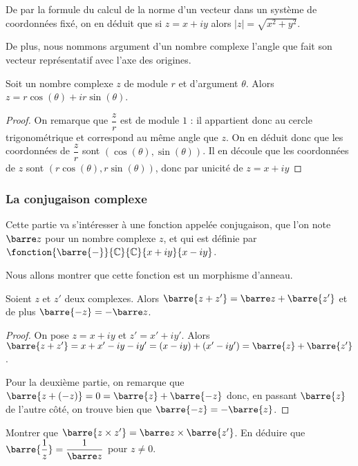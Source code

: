 De par la formule du calcul de la norme d'un vecteur dans un système de coordonnées fixé, on en déduit que si $z=x+iy$ alors $|z|=\sqrt{x^2+y^2}$.

De plus, nous nommons argument d'un nombre complexe l'angle que fait son vecteur représentatif avec l'axe des origines.

\begin{prop}
    Soit un nombre complexe $z$ de module $r$ et d'argument $\theta$. Alors $z=r\cos(\theta)+ir\sin(\theta)$.
\end{prop}
\begin{proof}
    On remarque que $\dfrac{z}{r}$ est de module $1$ : il appartient donc au cercle trigonométrique et correspond au même angle que $z$. On en déduit donc que les coordonnées de $\dfrac{z}{r}$ sont $(\cos(\theta),\sin(\theta))$. Il en découle que les coordonnées de $z$ sont $(r\cos(\theta),r\sin(\theta))$, donc par unicité de $z=x+iy$ 
\end{proof}

\subsubsection{La conjugaison complexe}

Cette partie va s'intéresser à une fonction appelée conjugaison, que l'on note $\barre z$ pour un nombre complexe $z$, et qui est définie par $\fonction{\barre{-}}{\mathbb C}{\mathbb C}{x+iy}{x-iy}$.

Nous allons montrer que cette fonction est un morphisme d'anneau.

\begin{prop}
    Soient $z$ et $z'$ deux complexes. Alors $\barre{z+z'}=\barre z + \barre{z'}$ et de plus $\barre{-z}=-\barre z$.
\end{prop}
\begin{proof}
    On pose $z=x+iy$ et $z'=x'+iy'$. Alors $\barre{z+z'}=x+x'-iy-iy'=(x-iy)+(x'-iy')=\barre{z}+\barre{z'}$.
    
    Pour la deuxième partie, on remarque que $\barre{z+(-z)}=0=\barre{z}+\barre{-z}$ donc, en passant $\barre{z}$ de l'autre côté, on trouve bien que $\barre{-z}=-\barre{z}$.
\end{proof}

\begin{exo}
    Montrer que $\barre{z\times z'}=\barre z \times \barre{z'}$. En déduire que $\barre{\dfrac{1}{z}}=\dfrac{1}{\barre z}$ pour $z\neq 0$.
\end{exo}

